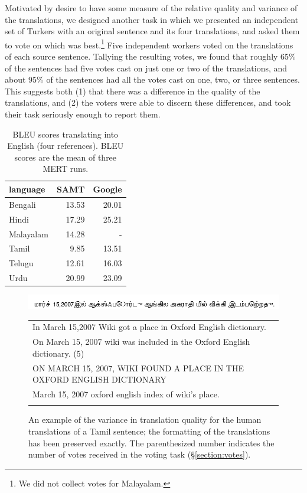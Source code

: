 \documentclass[11pt]{article}
\begin{document}
Motivated by desire to have some measure of the relative quality and variance of the translations,
we designed another task in which we presented an independent set of Turkers with an original
sentence and its four translations, and asked them to vote on which was best.\footnote{We did not
  collect votes for Malayalam.}  Five independent workers voted on the translations of each source
sentence.  Tallying the resulting votes, we found that roughly 65\% of the sentences had five votes
cast on just one or two of the translations, and about 95\% of the sentences had all the votes cast
on one, two, or three sentences.  This suggests both (1) that there was a difference in the quality
of the translations, and (2) the voters were able to discern these differences, and took their task
seriously enough to report them.

\begin{table}[t]
\centering
\begin{tabular}{l|rr}
  language  & SAMT &  Google \\
  \hline\hline
  Bengali    & 13.53  &  20.01 \\
  Hindi      & 17.29  & 25.21 \\  
  Malayalam    & 14.28  & - \\      
  Tamil      &  9.85  &  13.51 \\  
  Telugu     & 12.61  & 16.03  \\  
  Urdu        & 20.99  & 23.09 \\   
\end{tabular}
\caption{BLEU scores translating into English (four references).  BLEU
scores are the mean of three MERT runs.}
\label{table:bleu}
\end{table}

\begin{figure}[t]
  \centering
  \includegraphics[width=\textwidth]{../version1-figures/tamil.png}
  \begin{tabular}{l}
    \hline
    In March 15,2007 Wiki got a place in Oxford English dictionary. \\
    On March 15, 2007 wiki was included in the Oxford English
    dictionary. (5) \\
    ON MARCH 15, 2007, WIKI FOUND A PLACE IN THE OXFORD ENGLISH
    DICTIONARY \\
    March 15, 2007 oxford english index of wiki's place. \\ \\

  \end{tabular}
  \caption{An example of the variance in translation quality for the
    human translations of a Tamil sentence; the formatting of the
    translations has been preserved exactly.  The parenthesized number
    indicates the number of votes received in the voting task
    (\S\ref{section:votes}).}
  \label{figure:variance}
\end{figure}
\end{document}
